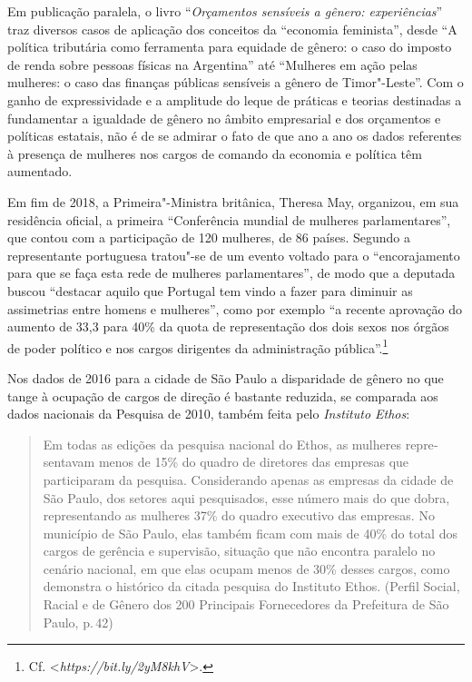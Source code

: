 Em publicação paralela, o livro ``\emph{Orçamentos sensíveis a gênero:
experiências}'' traz diversos casos de aplicação dos conceitos da
``economia feminista'', desde ``A política tributária como ferramenta
para equidade de gênero: o caso do imposto de renda sobre pessoas
físicas na Argentina'' até ``Mulheres em ação pelas mulheres: o caso das
finanças públicas sensíveis a gênero de Timor"-Leste''. Com o ganho de
expressividade e a amplitude do leque de práticas e teorias destinadas a
fundamentar a igualdade de gênero no âmbito empresarial e dos orçamentos
e políticas estatais, não é de se admirar o fato de que ano a ano os
dados referentes à presença de mulheres nos cargos de comando da
economia e política têm aumentado.

Em fim de 2018, a Primeira"-Ministra britânica, Theresa May, organizou,
em sua residência oficial, a primeira ``Conferência mundial de mulheres
parlamentares'', que contou com a participação de 120 mulheres, de 86
países. Segundo a representante portuguesa tratou"-se de um evento
voltado para o ``encorajamento para que se faça esta rede de mulheres
parlamentares'', de modo que a deputada buscou ``destacar aquilo que
Portugal tem vindo a fazer para diminuir as assimetrias entre homens e
mulheres'', como por exemplo ``a recente aprovação do aumento de 33,3
para 40\% da quota de representação dos dois sexos nos órgãos de poder
político e nos cargos dirigentes da administração pública''.\footnote{Cf.
  \textless{}\emph{https://bit.ly/2yM8khV}\textgreater{}.}

Nos dados de 2016 para a cidade de São Paulo a disparidade de gênero no
que tange à ocupação de cargos de direção é bastante reduzida, se
comparada aos dados nacionais da Pesquisa de 2010, também feita pelo
\emph{Instituto Ethos}:

\begin{quote}
Em todas as edições da pesquisa nacional do Ethos, as mulheres
repre­sentavam menos de 15\% do quadro de diretores das empresas que
participaram da pesquisa. Con­siderando apenas as empresas da cidade de
São Paulo, dos setores aqui pesquisados, esse número mais do que dobra,
representando as mulheres 37\% do quadro executivo das empresas. No
município de São Paulo, elas também ficam com mais de 40\% do total dos
cargos de ge­rência e supervisão, situação que não encontra paralelo no
cenário nacional, em que elas ocupam menos de 30\% desses cargos, como
de­monstra o histórico da citada pesquisa do Insti­tuto Ethos. (Perfil
Social, Racial e de Gênero dos 200 Principais Fornecedores da Prefeitura
de São Paulo, p.\,42)
\end{quote}

